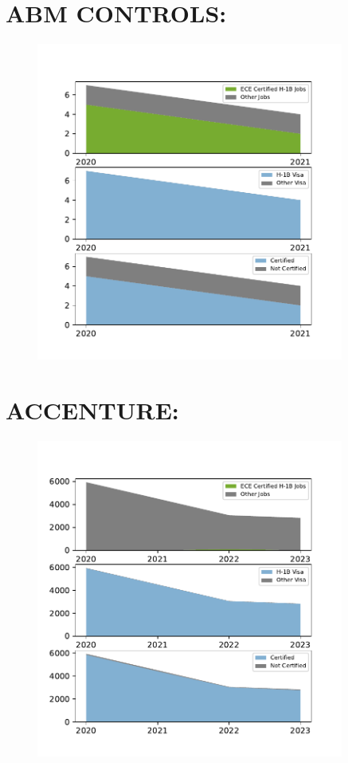 \documentclass{article}%
\begin{document}
%
\section{ABM CONTROLS:}%
\label{sec:ABMCONTROLS}%


\begin{figure}[h]%
\centering%
\includegraphics[width=0.9\textwidth]{./temp_img/ABMCONTROLS_detailed.pdf}%
\end{figure}

%
\section{ACCENTURE:}%
\label{sec:ACCENTURE}%


\begin{figure}[h]%
\centering%
\includegraphics[width=0.9\textwidth]{./temp_img/ACCENTURE_detailed.pdf}%
\end{figure}
\end{document}

